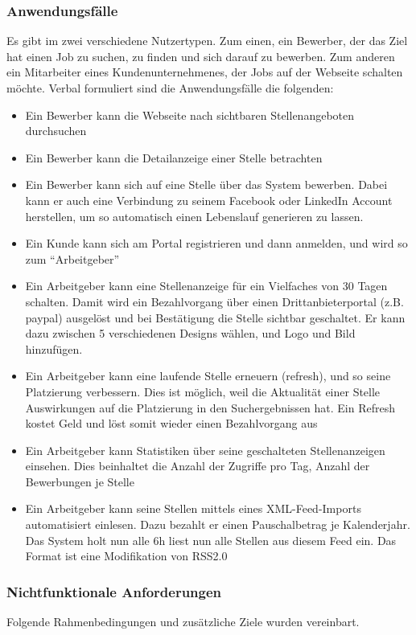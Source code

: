 \subsubsection{Anwendungsfälle}
Es gibt im zwei verschiedene Nutzertypen. Zum einen, ein Bewerber, der das Ziel hat einen Job zu suchen, zu finden und sich darauf zu bewerben. Zum anderen ein Mitarbeiter eines Kundenunternehmenes, der Jobs auf der Webseite schalten möchte.
Verbal formuliert sind die Anwendungsfälle die folgenden:
\begin{itemize}
 \item Ein Bewerber kann die Webseite nach sichtbaren Stellenangeboten durchsuchen
 \item Ein Bewerber kann die Detailanzeige einer Stelle betrachten
 \item Ein Bewerber kann sich auf eine Stelle über das System bewerben. Dabei kann er auch eine Verbindung zu seinem Facebook oder LinkedIn Account herstellen, um so automatisch einen Lebenslauf generieren zu lassen.
 \item Ein Kunde kann sich am Portal registrieren und dann anmelden, und wird so zum "`Arbeitgeber"'
 \item Ein Arbeitgeber kann eine Stellenanzeige für ein Vielfaches von 30 Tagen schalten. Damit wird ein Bezahlvorgang über einen Drittanbieterportal (z.B. paypal) ausgelöst und bei Bestätigung die Stelle sichtbar geschaltet. Er kann dazu zwischen 5 verschiedenen Designs wählen, und Logo und Bild hinzufügen. 
 \item Ein Arbeitgeber kann eine laufende Stelle erneuern (refresh), und so seine Platzierung verbessern. Dies ist möglich, weil die Aktualität einer Stelle Auswirkungen auf die Platzierung in den Suchergebnissen hat. Ein Refresh kostet Geld und löst somit wieder einen Bezahlvorgang aus
 \item Ein Arbeitgeber kann Statistiken über seine geschalteten Stellenanzeigen einsehen. Dies beinhaltet die Anzahl der Zugriffe pro Tag, Anzahl der Bewerbungen je Stelle
 \item Ein Arbeitgeber kann seine Stellen mittels eines XML-Feed-Imports automatisiert einlesen. Dazu bezahlt er einen Pauschalbetrag je Kalenderjahr. Das System holt nun alle 6h liest nun alle Stellen aus diesem Feed ein. Das Format ist eine Modifikation von RSS2.0  
\end{itemize}



\subsubsection{Nichtfunktionale Anforderungen}
Folgende Rahmenbedingungen und zusätzliche Ziele wurden vereinbart.

